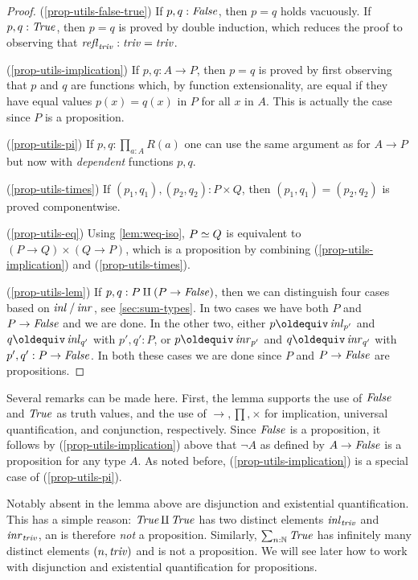\begin{proof}
(\ref{prop-utils-false-true})
If $p,q : \mathop{\mathit{False}}$, then $p=q$ holds vacuously.
If $p,q : \mathop{\mathit{True}}$, then $p=q$ is proved by double induction,
which reduces the proof to observing that $\mathop{{\it refl}_{\mathop{\mathit{triv}}}}: \mathop{\mathit{triv}}=\mathop{\mathit{triv}}$.

(\ref{prop-utils-implication})
If $p,q : A\to P$, then $p=q$ is proved by first observing that $p$ and $q$
are functions which, by function extensionality, are equal if they have
equal values $p(x) = q(x)$ in $P$ for all $x$ in $A$. This is
actually the case since $P$ is a proposition.

(\ref{prop-utils-pi})
If $p,q : \prod_{a:A} R(a)$ one can use the same argument as for $A\to P$
but now with \emph{dependent} functions $p,q$.

(\ref{prop-utils-times})
If $(p_1,q_1),(p_2,q_2) : P\times Q$, then $(p_1,q_1)=(p_2,q_2)$
is proved componentwise. 

(\ref{prop-utils-eq})
Using \cref{lem:weq-iso}, $P \simeq Q$ is equivalent to
$(P\to Q)\times(Q\to P)$, which is a proposition by 
combining (\ref{prop-utils-implication}) and (\ref{prop-utils-times}).

(\ref{prop-utils-lem}) 
If $p,q : P\amalg (P\to\mathop{\mathit{False}})$, then we can distinguish four cases
based on $\mathop{{\it inl}_{}}/\mathop{{\it inr}_{}}$, see \cref{sec:sum-types}. In two cases
we have both $P$ and $P\to\mathop{\mathit{False}}$ and we are done. In the other two,
either $p\jdeq \inl{p'}$ and $q\jdeq \inl{q'}$ with $p',q':P$,
or $p\jdeq \inr{p'}$ and $q\jdeq \inr{q'}$ with $p',q':P\to\mathop{\mathit{False}}$.
In both these cases we are done since $P$ and $P\to\mathop{\mathit{False}}$ 
are propositions.
\end{proof}

Several remarks can be made here. First, the lemma supports the
use of $\mathop{\mathit{False}}$ and $\mathop{\mathit{True}}$ as truth values, and the use of
$\to,\prod,\times$ for implication, universal quantification,
and conjunction, respectively. Since $\mathop{\mathit{False}}$ is a proposition,
it follows by (\ref{prop-utils-implication}) above that
$\neg A$ as defined by $A\to\mathop{\mathit{False}}$ is a proposition for any type $A$.
As noted before, (\ref{prop-utils-implication}) is a
special case of (\ref{prop-utils-pi}).

Notably absent in the lemma above are disjunction
and existential quantification. This has a simple reason:
$\mathop{\mathit{True}}\amalg \mathop{\mathit{True}}$ has two distinct elements
$\mathop{{\it inl}_{\mathop{\mathit{triv}}}}$ and $\mathop{{\it inr}_{\mathop{\mathit{triv}}}}$, an is therefore \emph{not} a proposition.
Similarly, $\sum_{n:\mathbb{N}} \mathop{\mathit{True}}$ has infinitely many
distinct elements $(n,\mathop{\mathit{triv}})$ and is not a proposition. We will see later how
to work with disjunction and existential quantification for propositions.

